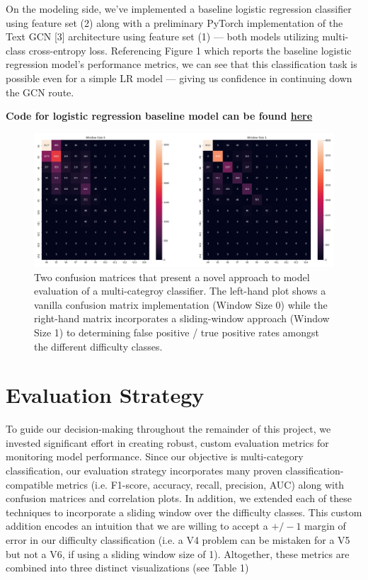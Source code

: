 \documentclass{article}
\begin{document}
On the modeling side, we've implemented a baseline logistic regression classifier using feature set (2) along with a preliminary PyTorch implementation of the Text GCN [3] architecture using feature set (1) --- both models utilizing multi-class cross-entropy loss. Referencing Figure 1 which reports the baseline logistic regression model's performance metrics, we can see that this classification task is possible even for a simple LR model --- giving us confidence in continuing down the GCN route.

{\small\textbf{Code for logistic regression baseline model can be found \href{https://github.com/gestalt-howard/moonGen/tree/master/howard/models_baseline}{here}}}

\begin{figure}
\centering
\includegraphics[width=.8\linewidth]{confusion_window}
\caption{Two confusion matrices that present a novel approach to model evaluation of a multi-categroy classifier. The left-hand plot shows a vanilla confusion matrix implementation (Window Size 0) while the right-hand matrix incorporates a sliding-window approach (Window Size 1) to determining false positive / true positive rates amongst the different difficulty classes.}
\end{figure}

\section{Evaluation Strategy}
To guide our decision-making throughout the remainder of this project, we invested significant effort in creating robust, custom evaluation metrics for monitoring model performance. Since our objective is multi-category classification, our evaluation strategy incorporates many proven classification-compatible metrics (i.e. F1-score, accuracy, recall, precision, AUC) along with confusion matrices and correlation plots. In addition, we extended each of these techniques to incorporate a sliding window over the difficulty classes. This custom addition encodes an intuition that we are willing to accept a \(+/- 1\) margin of error in our difficulty classification (i.e. a V4 problem can be mistaken for a V5 but not a V6, if using a sliding window size of 1). Altogether, these metrics are combined into three distinct visualizations (see Table 1) 
\end{document}
